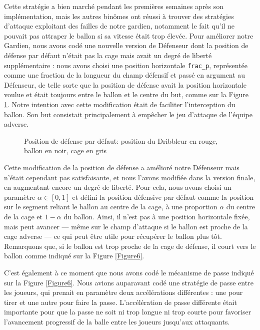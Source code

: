 \documentclass[a4paper,12pt]{article}
\begin{document}
Cette stratégie a bien marché pendant les premières semaines après son implémentation, mais les autres binômes ont réussi à trouver des stratégies d'attaque exploitant des failles de notre gardien, notamment le fait qu'il ne pouvait pas attraper le ballon si sa vitesse était trop élevée. Pour améliorer notre Gardien, nous avons codé une nouvelle version de Défenseur dont la position de défense par défaut n'était pas la cage mais avait un degré de liberté supplémentaire : nous avons choisi une position horizontale \texttt{frac\_p}, représentée comme une fraction de la longueur du champ défensif et passé en argument au Défenseur, de telle sorte que la position de défense avait la position horizontale voulue et était toujours entre le ballon et le centre du but, comme sur la Figure \ref{Figure8}. Notre intention avec cette modification était de faciliter l'interception du ballon. Son but consistait principalement à empêcher le jeu d'attaque de l'équipe adverse.

\begin{figure}[ht]
\centering

\caption{Position de défense par défaut: position du Dribbleur en rouge, ballon en noir, cage en gris}
\label{Figure8}
\end{figure}

Cette modification de la position de défense a amélioré notre Défenseur mais n'était cependant pas satisfaisante, et nous l'avons modifiée dans la version finale, en augmentant encore un degré de liberté. Pour cela, nous avons choisi un paramètre $\alpha \in [0, 1]$ et défini la position défensive par défaut comme la position sur le segment reliant le ballon au centre de la cage, à une proportion $\alpha$ du centre de la cage et $1 - \alpha$ du ballon. Ainsi, il n'est pas à une position horizontale fixée, mais peut avancer --- même sur le champ d'attaque si le ballon est proche de la cage adverse --- ce qui peut être utile pour récupérer le ballon plus tôt. Remarquons que, si le ballon est trop proche de la cage de défense, il court vers le ballon comme indiqué sur la Figure \ref{Figure6}.

C'est également à ce moment que nous avons codé le mécanisme de passe indiqué sur la Figure \ref{Figure6}. Nous avions auparavant codé une stratégie de passe entre les joueurs, qui prenait en paramètre deux accélérations différentes : une pour tirer et une autre pour faire la passe. L'accélération de passe différente était importante pour que la passe ne soit ni trop longue ni trop courte pour favoriser l’avancement progressif de la balle entre les joueurs jusqu’aux attaquants. 
\end{document}
